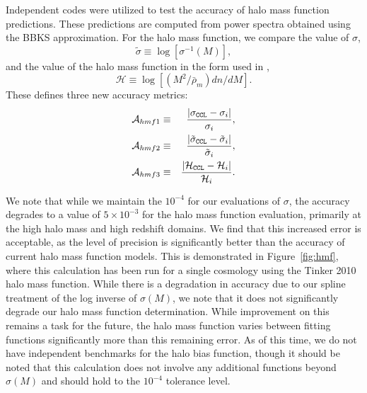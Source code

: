 \documentclass[\docopts]{\docclass}
\begin{document}
Independent codes were utilized to test the accuracy of halo mass function predictions. These predictions are computed from power spectra obtained using the BBKS approximation. For the halo mass function, we compare the value of $\sigma$,
\begin{equation}
  \tilde\sigma\equiv\log[\sigma^{-1}(M)],\label{eq:tildesig}
\end{equation}
and the value of the halo mass function in the form used in \cite{Tinker2008},
\begin{equation}
  \mathcal{H}\equiv \log[(M^2/\bar{\rho}_m)dn/dM].
  \label{eq:newhmf}
\end{equation}
These defines three new accuracy metrics:
\begin{eqnarray}
  \mathcal{A}_{hmf1}&\equiv&\frac{|\sigma_{\tt CCL}-\sigma_i|}{\sigma_i},\\
  \mathcal{A}_{hmf2}&\equiv&\frac{|\tilde\sigma_{\tt CCL}-\tilde\sigma_i|}{\tilde\sigma_i},\\
  \mathcal{A}_{hmf3}&\equiv&\frac{|\mathcal{H}_{\tt CCL}-\mathcal{H}_i|}{\mathcal{H}_i}.
\end{eqnarray}

We note that while we maintain the $10^{-4}$ for our evaluations of $\sigma$, the accuracy degrades to a value of $5\times10^{-3}$ for the halo mass function evaluation, primarily at the high halo mass and high redshift domains. We find that this increased error is acceptable, as the level of precision is significantly better than the accuracy of current halo mass function models. This is demonstrated in Figure~\ref{fig:hmf}, where this calculation has been run for a single cosmology using the Tinker 2010 halo mass function. While there is a degradation in accuracy due to our spline treatment of the log inverse of $\sigma(M)$, we note that it does not significantly degrade our halo mass function determination. While improvement on this remains a task for the future, the halo mass function varies between fitting functions significantly more than this remaining error. As of this time, we do not have independent benchmarks for the halo bias function, though it should be noted that this calculation does not involve any additional functions beyond $\sigma(M)$ and should hold to the $10^{-4}$ tolerance level.
\end{document}

